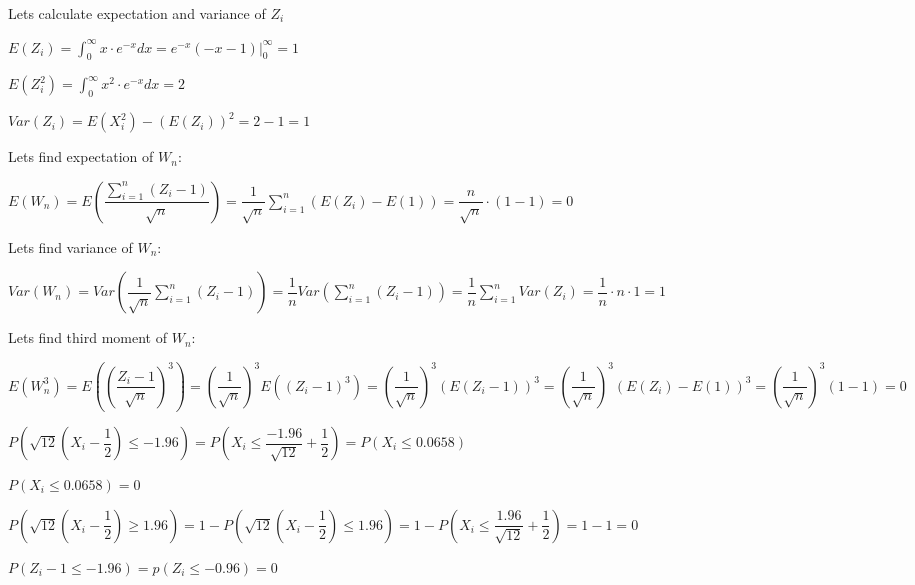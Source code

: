 \documentclass[12pt]{article}
\begin{document}
\begin{list}{()~}{}
\medskip

Lets calculate expectation and variance of $Z_i$

$E\left(Z_i\right)=\int_0^{\infty}x\cdot e^{-x}dx = e^{-x}\left(-x-1\right)\vert_0^{\infty}=1$

$E\left(Z_i^2\right)=\int_0^{\infty}x^2\cdot e^{-x}dx = 2$

$Var\left(Z_i\right)=E\left(X_i^2\right)-\left(E\left(Z_i\right)\right)^2=2-1=1$

\medskip

Lets find expectation of $W_n$:

$E\left(W_n\right)=E\left(\dfrac{\sum_{i=1}^n\left(Z_i-1\right)}{\sqrt{n}}\right)=\dfrac{1}{\sqrt{n}}\sum_{i=1}^n\left(E\left(Z_i\right)-E\left(1\right)\right) = \dfrac{n}{\sqrt{n}}\cdot \left(1-1\right)=0$

\medskip

Lets find variance of $W_n$:

$Var\left(W_n\right)=Var\left(\dfrac{1}{\sqrt{n}}\sum_{i=1}^n\left(Z_i-1\right)\right)=\dfrac{1}{n}Var\left(\sum_{i=1}^n\left(Z_i-1\right)\right)=\dfrac{1}{n}\sum_{i=1}^n Var\left(Z_i\right)=\dfrac{1}{n}\cdot n \cdot 1 = 1$

\medskip 

Lets find third moment of $W_n$:

$E\left(W_n^3\right)=E\left(\left(\dfrac{Z_i-1}{\sqrt{n}}\right)^3\right)=\left(\dfrac{1}{\sqrt{n}}\right)^3 E\left(\left(Z_i-1\right)^3\right)=\left(\dfrac{1}{\sqrt{n}}\right)^3 \left(E\left(Z_i-1\right)\right)^3=\left(\dfrac{1}{\sqrt{n}}\right)^3\left(E\left(Z_i\right)-E\left(1\right)\right)^3=\left(\dfrac{1}{\sqrt{n}}\right)^3\left(1-1\right)=0$

\item 
{}
\begin{list}{)~}{}
\item $P\left(\sqrt{12}\left(X_i-\dfrac{1}{2}\right)\leq -1.96\right)=P\left(X_i \leq \dfrac{-1.96}{\sqrt{12}}+\dfrac{1}{2}\right)=P\left(X_i\leq 0.0658\right)$

$P\left(X_i\leq 0.0658\right) = 0$

\item $P\left(\sqrt{12}\left(X_i-\dfrac{1}{2}\right)\geq 1.96\right)=1-P\left(\sqrt{12}\left(X_i-\dfrac{1}{2}\right)\leq 1.96\right)=1-P\left(X_i \leq \dfrac{1.96}{\sqrt{12}}+\dfrac{1}{2}\right)=1-1=0$

\item $P\left(Z_i-1\leq -1.96\right)=p\left(Z_i \leq -0.96\right) = 0$


\end{list}
\end{list}
\end{document}
